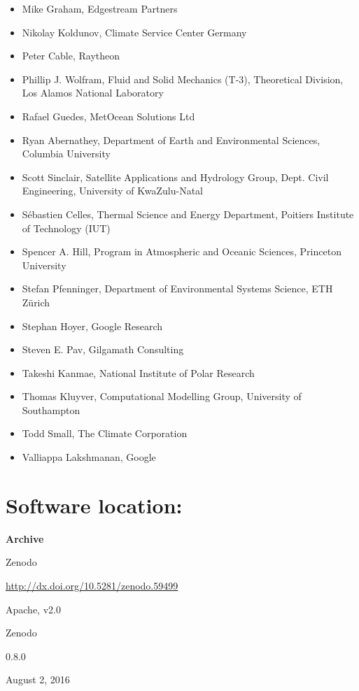 \documentclass{jors}
\begin{document}
\begin{itemize}
\item Mike Graham, Edgestream Partners
\item Nikolay Koldunov, Climate Service Center Germany
\item Peter Cable, Raytheon
\item Phillip J. Wolfram, Fluid and Solid Mechanics (T-3), Theoretical Division, Los Alamos National Laboratory
\item Rafael Guedes, MetOcean Solutions Ltd
\item Ryan Abernathey, Department of Earth and Environmental Sciences, Columbia University
\item Scott Sinclair, Satellite Applications and Hydrology Group, Dept. Civil Engineering, University of KwaZulu-Natal
\item Sébastien Celles, Thermal Science and Energy Department, Poitiers Institute of Technology (IUT)
\item Spencer A. Hill, Program in Atmospheric and Oceanic Sciences, Princeton University
\item Stefan Pfenninger, Department of Environmental Systems Science, ETH Zürich
\item Stephan Hoyer, Google Research
\item Steven E. Pav, Gilgamath Consulting
\item Takeshi Kanmae, National Institute of Polar Research
\item Thomas Kluyver, Computational Modelling Group, University of Southampton
\item Todd Small, The Climate Corporation
\item Valliappa Lakshmanan, Google
\end{itemize}

\section*{Software location:}

{\bf Archive}

\begin{description}[noitemsep,topsep=0pt]
	\item[Name:] Zenodo
	\item[Persistent identifier:] \url{http://dx.doi.org/10.5281/zenodo.59499}
	\item[Licence:] Apache, v2.0
	\item[Publisher:]  Zenodo
	\item[Version published:] 0.8.0
	\item[Date published:] August 2, 2016
\end{description}
\end{document}
